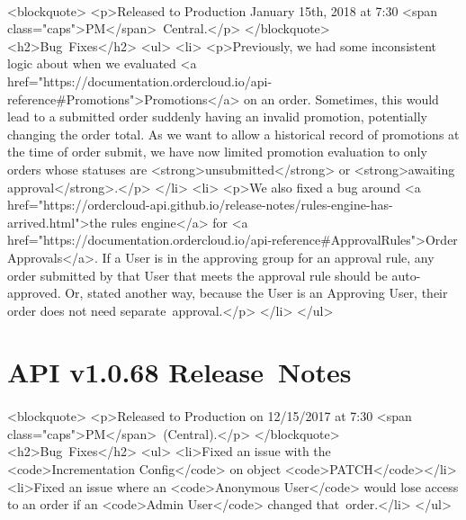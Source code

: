 \documentclass{memoir}%
\begin{document}
\paragraph*{}%
<blockquote>\newline%
<p>Released to Production January 15th, 2018 at 7:30 <span class="caps">PM</span>~Central.</p>\newline%
</blockquote>\newline%
<h2>Bug~Fixes</h2>\newline%
<ul>\newline%
<li>\newline%
<p>Previously, we had some inconsistent logic about when we evaluated <a href="https://documentation.ordercloud.io/api{-}reference\#Promotions">Promotions</a> on an order. Sometimes, this would lead to a submitted order suddenly having an invalid promotion, potentially changing the order total. \newline%
As we want to allow a historical record of promotions at the time of order submit, we have now limited promotion evaluation to only orders whose statuses are <strong>unsubmitted</strong> or <strong>awaiting approval</strong>.</p>\newline%
</li>\newline%
<li>\newline%
<p>We also fixed a bug around <a href="https://ordercloud{-}api.github.io/release{-}notes/rules{-}engine{-}has{-}arrived.html">the rules engine</a> for  <a href="https://documentation.ordercloud.io/api{-}reference\#ApprovalRules">Order Approvals</a>. If a User is in the approving group for an approval rule, any order submitted by that User that meets the approval rule should be auto{-}approved. Or, stated another way, because the User is an Approving User, their order does not need separate~approval.</p>\newline%
</li>\newline%
</ul>

%
\section*{API v1.0.68 Release~Notes}%
\paragraph*{}%

%
\paragraph*{}%
<blockquote>\newline%
<p>Released to Production on 12/15/2017 at 7:30 <span class="caps">PM</span>~(Central).</p>\newline%
</blockquote>\newline%
<h2>Bug~Fixes</h2>\newline%
<ul>\newline%
<li>Fixed an issue with the <code>Incrementation Config</code> on object <code>PATCH</code></li>\newline%
<li>Fixed an issue where an <code>Anonymous User</code> would lose access to an order if an <code>Admin User</code> changed that~order.</li>\newline%
</ul>
\end{document}
